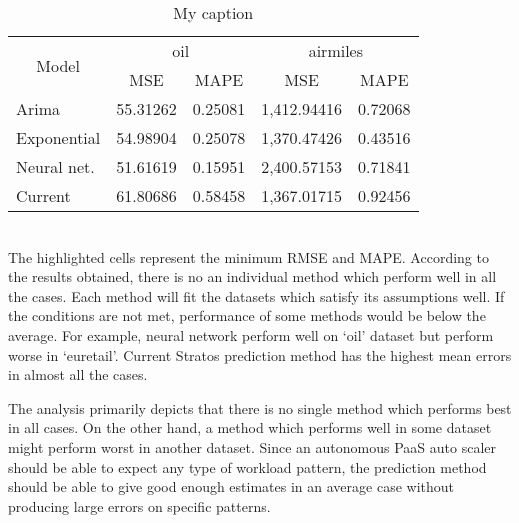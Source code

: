 \begin{table}[]
\centering
\caption{My caption}
\label{my-label}
\begin{tabular}{|l|r|r|r|r|}
\hline
\multicolumn{1}{|c|}{\multirow{2}{*}{Model}} & \multicolumn{2}{c|}{oil}                             & \multicolumn{2}{c|}{airmiles}                        \\ \cline{2-5} 
\multicolumn{1}{|c|}{}                       & \multicolumn{1}{c|}{MSE} & \multicolumn{1}{c|}{MAPE} & \multicolumn{1}{c|}{MSE} & \multicolumn{1}{c|}{MAPE} \\ \hline
Arima                                        & 55.31262                 & 0.25081                   & 1,412.94416              & 0.72068                   \\ \hline
Exponential                                  & 54.98904                 & 0.25078                   & 1,370.47426              & 0.43516                   \\ \hline
Neural net.                                         & 51.61619                 & 0.15951                   & 2,400.57153              & 0.71841                   \\ \hline
Current                                      & 61.80686                 & 0.58458                   & 1,367.01715              & 0.92456                   \\ \hline
\end{tabular}
\end{table}

\\The highlighted cells represent the minimum RMSE and MAPE. According to the results obtained, there is no an individual method which perform well in all the cases. Each method will fit the datasets which satisfy its assumptions well. If the conditions are not met, performance of some methods would be below the average. For example, neural network perform well on ‘oil’ dataset but perform worse in ‘euretail’. Current Stratos prediction method has the highest mean errors in almost all the cases.

The analysis primarily depicts that there is no single method which performs best in all cases. On the other hand, a method which performs well in some dataset might perform worst in another dataset.
Since an autonomous PaaS auto scaler should be able to expect any type of workload pattern, the prediction method should be able to give good enough estimates in an average case without producing large errors on specific patterns.

